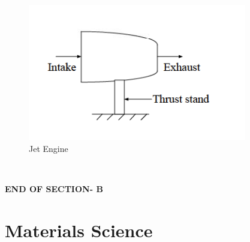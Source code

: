 \documentclass[journal,12pt,onecolumn]{IEEEtran}
\begin{document}
\begin{enumerate}[label=\arabic*)]
\begin{figure}[htbp]
  \centering
  \includegraphics[width=.75\linewidth]{figs/B/fig5.png}
  \caption{Jet Engine}
  \label{B/fig5}
\end{figure}
\hfill{} \\

\end{enumerate}

\vspace{3\baselineskip}
\begin{center}
    \item[\textbf{END OF SECTION- B}]
\end{center}




\newpage
\section*{Materials Science}
\noindent
\vspace{1cm}
\end{document}
